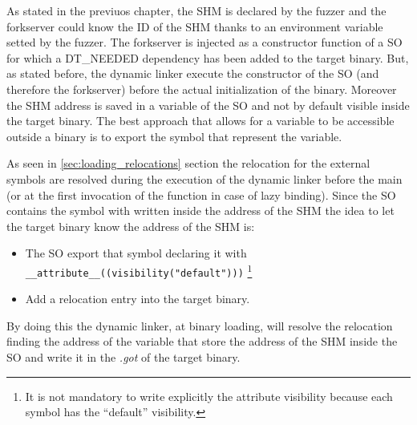 As stated in the previuos chapter, the \gls{SHM} is declared by the fuzzer and the forkserver could 
know the ID of the \gls{SHM} thanks to an environment variable setted by the fuzzer.
The forkserver is injected as a constructor function of a \gls{SO} for which a DT\_NEEDED dependency 
has been added to the target binary.
But, as stated before, the dynamic linker execute the constructor of the \gls{SO} (and therefore the forkserver) before 
the actual initialization of the binary.
Moreover the \gls{SHM} address is saved in a variable of the \gls{SO} and not by default visible inside the target binary.
The best approach that allows for a variable to be accessible outside a binary is to export the symbol 
that represent the variable.

As seen in \cref{sec:loading_relocations} section the relocation for the external symbols are resolved during the 
execution of the dynamic linker before the main (or at the first invocation of the function in case of lazy binding).
Since the \gls{SO} contains the symbol with written inside the address of the \gls{SHM} the idea to let the target binary 
know the address of the \gls{SHM} is:
\begin{itemize}
    \item The \gls{SO} export that symbol declaring it with\\\texttt{\_\_attribute\_\_((visibility("default")))} \footnote{
        It is not mandatory to write explicitly the attribute visibility because each symbol has the ``default'' visibility.
    }
    \item Add a relocation entry into the target binary. 
\end{itemize}
By doing this the dynamic linker, at binary loading, will resolve the relocation finding the address of the variable 
that store the address of the \gls{SHM} inside the \gls{SO} and write it in the \textit{.got} of the target binary.

